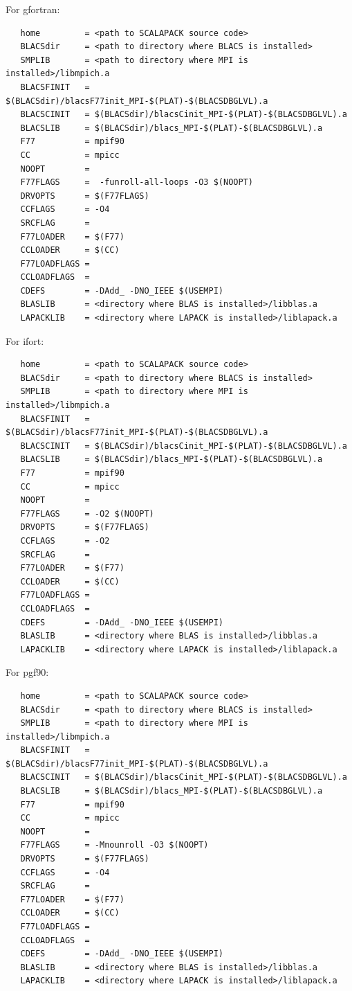 \documentclass[12pt]{article}
\begin{document}
\begin{itemize}
For gfortran:
\begin{verbatim}
   home         = <path to SCALAPACK source code>
   BLACSdir     = <path to directory where BLACS is installed>
   SMPLIB       = <path to directory where MPI is installed>/libmpich.a
   BLACSFINIT   = $(BLACSdir)/blacsF77init_MPI-$(PLAT)-$(BLACSDBGLVL).a
   BLACSCINIT   = $(BLACSdir)/blacsCinit_MPI-$(PLAT)-$(BLACSDBGLVL).a
   BLACSLIB     = $(BLACSdir)/blacs_MPI-$(PLAT)-$(BLACSDBGLVL).a
   F77          = mpif90
   CC           = mpicc
   NOOPT        = 
   F77FLAGS     =  -funroll-all-loops -O3 $(NOOPT)
   DRVOPTS      = $(F77FLAGS)
   CCFLAGS      = -O4
   SRCFLAG      =
   F77LOADER    = $(F77)
   CCLOADER     = $(CC)
   F77LOADFLAGS =
   CCLOADFLAGS  =
   CDEFS        = -DAdd_ -DNO_IEEE $(USEMPI)
   BLASLIB      = <directory where BLAS is installed>/libblas.a
   LAPACKLIB    = <directory where LAPACK is installed>/liblapack.a
\end{verbatim}

For ifort:
\begin{verbatim}
   home         = <path to SCALAPACK source code>
   BLACSdir     = <path to directory where BLACS is installed>
   SMPLIB       = <path to directory where MPI is installed>/libmpich.a
   BLACSFINIT   = $(BLACSdir)/blacsF77init_MPI-$(PLAT)-$(BLACSDBGLVL).a
   BLACSCINIT   = $(BLACSdir)/blacsCinit_MPI-$(PLAT)-$(BLACSDBGLVL).a
   BLACSLIB     = $(BLACSdir)/blacs_MPI-$(PLAT)-$(BLACSDBGLVL).a
   F77          = mpif90
   CC           = mpicc
   NOOPT        = 
   F77FLAGS     = -O2 $(NOOPT)
   DRVOPTS      = $(F77FLAGS)
   CCFLAGS      = -O2
   SRCFLAG      =
   F77LOADER    = $(F77)
   CCLOADER     = $(CC)
   F77LOADFLAGS =
   CCLOADFLAGS  =
   CDEFS        = -DAdd_ -DNO_IEEE $(USEMPI)
   BLASLIB      = <directory where BLAS is installed>/libblas.a
   LAPACKLIB    = <directory where LAPACK is installed>/liblapack.a
\end{verbatim}

For pgf90:
\begin{verbatim}
   home         = <path to SCALAPACK source code>
   BLACSdir     = <path to directory where BLACS is installed>
   SMPLIB       = <path to directory where MPI is installed>/libmpich.a
   BLACSFINIT   = $(BLACSdir)/blacsF77init_MPI-$(PLAT)-$(BLACSDBGLVL).a
   BLACSCINIT   = $(BLACSdir)/blacsCinit_MPI-$(PLAT)-$(BLACSDBGLVL).a
   BLACSLIB     = $(BLACSdir)/blacs_MPI-$(PLAT)-$(BLACSDBGLVL).a
   F77          = mpif90
   CC           = mpicc
   NOOPT        = 
   F77FLAGS     = -Mnounroll -O3 $(NOOPT)
   DRVOPTS      = $(F77FLAGS)
   CCFLAGS      = -O4
   SRCFLAG      =
   F77LOADER    = $(F77)
   CCLOADER     = $(CC)
   F77LOADFLAGS =
   CCLOADFLAGS  =
   CDEFS        = -DAdd_ -DNO_IEEE $(USEMPI)
   BLASLIB      = <directory where BLAS is installed>/libblas.a
   LAPACKLIB    = <directory where LAPACK is installed>/liblapack.a
\end{verbatim}

\end{itemize}
\end{document}

